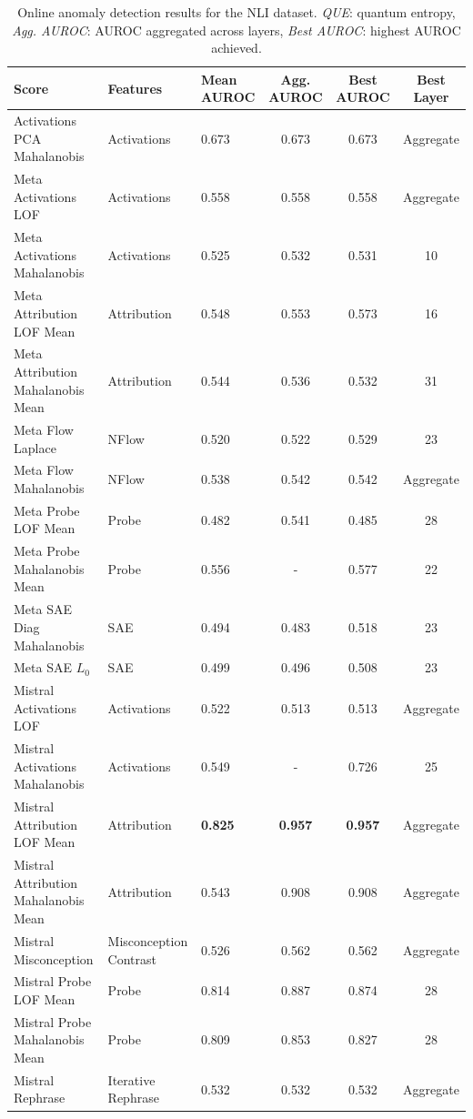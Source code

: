 \begin{table}[H]
\centering
\scriptsize  %
\renewcommand{\arraystretch}{1.2}  %
\setlength{\tabcolsep}{2pt}  %
\begin{tabular}{lp{3cm}lccc}
\toprule
\textbf{Score} & \textbf{Features} & \textbf{Mean AUROC} & \textbf{Agg. AUROC} & \textbf{Best AUROC} & \textbf{Best Layer} \\
\midrule
Activations PCA Mahalanobis          & Activations & 0.673  & 0.673  & 0.673  & Aggregate \\ 
Meta Activations LOF                 & Activations & 0.558  & 0.558  & 0.558  & Aggregate \\ 
Meta Activations Mahalanobis         & Activations & 0.525  & 0.532  & 0.531  & 10 \\ 
Meta Attribution LOF Mean            & Attribution & 0.548  & 0.553  & 0.573  & 16 \\ 
Meta Attribution Mahalanobis Mean    & Attribution & 0.544  & 0.536  & 0.532  & 31 \\ 
Meta Flow Laplace                    & NFlow      & 0.520  & 0.522  & 0.529  & 23 \\ 
Meta Flow Mahalanobis                & NFlow      & 0.538  & 0.542  & 0.542  & Aggregate \\ 
Meta Probe LOF Mean                  & Probe      & 0.482  & 0.541  & 0.485  & 28 \\ 
Meta Probe Mahalanobis Mean          & Probe      & 0.556  & -      & 0.577  & 22 \\ 
Meta SAE Diag Mahalanobis            & SAE        & 0.494  & 0.483  & 0.518  & 23 \\ 
Meta SAE $L_0$                          & SAE        & 0.499  & 0.496  & 0.508  & 23 \\ 
Mistral Activations LOF              & Activations & 0.522  & 0.513  & 0.513  & Aggregate \\ 
Mistral Activations Mahalanobis      & Activations & 0.549  & -      & 0.726  & 25 \\ 
Mistral Attribution LOF Mean         & Attribution & \textbf{0.825}  & \textbf{0.957}  & \textbf{0.957}  & Aggregate \\ 
Mistral Attribution Mahalanobis Mean & Attribution & 0.543  & 0.908  & 0.908  & Aggregate \\ 
Mistral Misconception                & Misconception Contrast & 0.526  & 0.562  & 0.562  & Aggregate \\ 
Mistral Probe LOF Mean               & Probe      & 0.814  & 0.887  & 0.874  & 28 \\ 
Mistral Probe Mahalanobis Mean       & Probe      & 0.809  & 0.853  & 0.827  & 28 \\ 
Mistral Rephrase                     & Iterative Rephrase & 0.532  & 0.532  & 0.532  & Aggregate \\ 
\bottomrule
\end{tabular}
\caption{ Online anomaly detection results for the NLI dataset. \emph{QUE}: quantum entropy, \emph{Agg. AUROC}: AUROC aggregated across layers, \emph{Best AUROC}: highest AUROC achieved.}
\label{tab:online_anomaly_nli}
\end{table}
